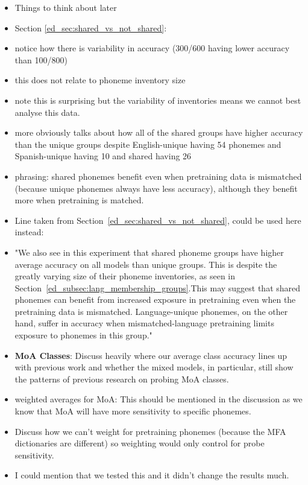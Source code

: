 \begin{itemize}
    \item Things to think about later 
    \item Section \ref{ed_sec:shared_vs_not_shared}:
    \item notice how there is variability in accuracy (300/600 having lower accuracy than 100/800)
    \item this does not relate to phoneme inventory size
    \item note this is surprising but the variability of inventories means we cannot best analyse this data.
    \item more obviously talks about how all of the shared groups have higher accuracy than the unique groups despite English-unique having 54 phonemes and Spanish-unique having 10 and shared having 26
    \item phrasing: shared phonemes benefit even when pretraining data is mismatched (because unique phonemes always have less accuracy), although they benefit more when pretraining is matched.
    \item Line taken from Section~\ref{ed_sec:shared_vs_not_shared}, could be used here instead:
    \item "We also see in this experiment that shared phoneme groups have higher average accuracy on all models than unique groups. This is despite the greatly varying size of their phoneme inventories, as seen in Section~\ref{ed_subsec:lang_membership_groups}.This may suggest that shared phonemes can benefit from increased exposure in pretraining even when the pretraining data is mismatched. Language-unique phonemes, on the other hand, suffer in accuracy when mismatched-language pretraining limits exposure to phonemes in this group."

    \item \textbf{MoA Classes}: Discuss heavily where our average class accuracy lines up with previous work and whether the mixed models, in particular, still show the patterns of previous research on probing MoA classes. 
    \item weighted averages for MoA: This should be mentioned in the discussion as we know that MoA will have more sensitivity to specific phonemes.
    \item Discuss how we can't weight for pretraining phonemes (because the MFA dictionaries are different) so weighting would only control for probe sensitivity. 
    \item I could mention that we tested this and it didn't change the results much.


\end{itemize}
